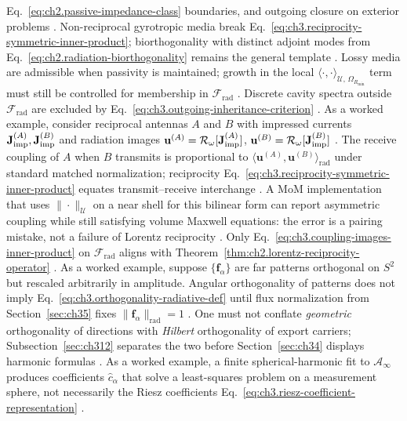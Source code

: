 Eq.~\eqref{eq:ch2.passive-impedance-class} boundaries, and outgoing closure on exterior problems
\cite{stratton1941}. Non-reciprocal gyrotropic media break
Eq.~\eqref{eq:ch3.reciprocity-symmetric-inner-product}; biorthogonality with distinct adjoint modes from
Eq.~\eqref{eq:ch2.radiation-biorthogonality} remains the general template \cite{stratton1941}.
Lossy media are admissible when passivity is maintained; growth in the local
\(\langle\cdot,\cdot\rangle_{\mathcal{U},\,\Omega_{R_{\min}}}\) term must still be controlled for membership
in \(\mathcal{F}_{\mathrm{rad}}\) \cite{stratton1941}. Discrete cavity spectra outside
\(\mathcal{F}_{\mathrm{rad}}\) are excluded by Eq.~\eqref{eq:ch3.outgoing-inheritance-criterion}
\cite{harrington2001}.
As a worked example, consider reciprocal antennas \(A\) and \(B\) with impressed currents \(\mathbf{J}_{\mathrm{imp}}^{(A)},\mathbf{J}_{\mathrm{imp}}^{(B)}\) and
radiation images \(\mathbf{u}^{(A)}=\mathcal{R}_\omega[\mathbf{J}_{\mathrm{imp}}^{(A)}]\),
\(\mathbf{u}^{(B)}=\mathcal{R}_\omega[\mathbf{J}_{\mathrm{imp}}^{(B)}]\) \cite{harrington2001}. The receive coupling
of \(A\) when \(B\) transmits is proportional to
\(\langle \mathbf{u}^{(A)},\mathbf{u}^{(B)}\rangle_{\mathrm{rad}}\) under standard matched normalization;
reciprocity Eq.~\eqref{eq:ch3.reciprocity-symmetric-inner-product} equates transmit--receive interchange
\cite{stratton1941}. A MoM implementation that uses \(\|\cdot\|_{\mathcal{U}}\) on a near shell
for this bilinear form can report asymmetric coupling while still satisfying volume Maxwell equations: the
error is a pairing mistake, not a failure of Lorentz reciprocity \cite{harrington2001}. Only
Eq.~\eqref{eq:ch3.coupling-images-inner-product} on \(\mathcal{F}_{\mathrm{rad}}\) aligns with
Theorem~\ref{thm:ch2.lorentz-reciprocity-operator} \cite{stratton1941}.
As a worked example, suppose \(\{\mathbf{f}_\alpha\}\) are far patterns orthogonal on \(S^{2}\) but rescaled arbitrarily in
amplitude. Angular orthogonality of patterns does not imply
Eq.~\eqref{eq:ch3.orthogonality-radiative-def} until flux normalization from Section~\ref{sec:ch35} fixes
\(\|\mathbf{f}_\alpha\|_{\mathrm{rad}}=1\) \cite{stratton1941}. One must not conflate \emph{geometric}
orthogonality of directions with \emph{Hilbert} orthogonality of export carriers; Subsection~\ref{sec:ch312}
separates the two before Section~\ref{sec:ch34} displays harmonic formulas \cite{harrington2001}.
As a worked example, a finite spherical-harmonic fit to \(\mathcal{A}_\infty\) produces coefficients
\(\widehat{c}_\alpha\) that solve a least-squares problem on a measurement sphere, not necessarily the
Riesz coefficients Eq.~\eqref{eq:ch3.riesz-coefficient-representation} \cite{harrington2001}.
